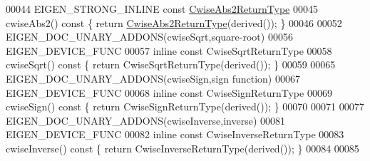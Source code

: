 \begin{DoxyCode}
00044 EIGEN\_STRONG\_INLINE \textcolor{keyword}{const} \hyperlink{group___core___module_class_eigen_1_1_cwise_unary_op}{CwiseAbs2ReturnType}
00045 cwiseAbs2()\textcolor{keyword}{ const }\{ \textcolor{keywordflow}{return} \hyperlink{group___core___module_class_eigen_1_1_cwise_unary_op}{CwiseAbs2ReturnType}(derived()); \}
00046 
00052 EIGEN\_DOC\_UNARY\_ADDONS(cwiseSqrt,square-root)
00056 EIGEN\_DEVICE\_FUNC
00057 \textcolor{keyword}{inline} \textcolor{keyword}{const} CwiseSqrtReturnType
00058 cwiseSqrt()\textcolor{keyword}{ const }\{ \textcolor{keywordflow}{return} CwiseSqrtReturnType(derived()); \}
00059 
00065 EIGEN\_DOC\_UNARY\_ADDONS(cwiseSign,sign \textcolor{keyword}{function})
00067 EIGEN\_DEVICE\_FUNC
00068 \textcolor{keyword}{inline} \textcolor{keyword}{const} CwiseSignReturnType
00069 cwiseSign()\textcolor{keyword}{ const }\{ \textcolor{keywordflow}{return} CwiseSignReturnType(derived()); \}
00070 
00071 
00077 EIGEN\_DOC\_UNARY\_ADDONS(cwiseInverse,inverse)
00081 EIGEN\_DEVICE\_FUNC
00082 \textcolor{keyword}{inline} \textcolor{keyword}{const} CwiseInverseReturnType
00083 cwiseInverse()\textcolor{keyword}{ const }\{ \textcolor{keywordflow}{return} CwiseInverseReturnType(derived()); \}
00084 
00085 
\end{DoxyCode}
